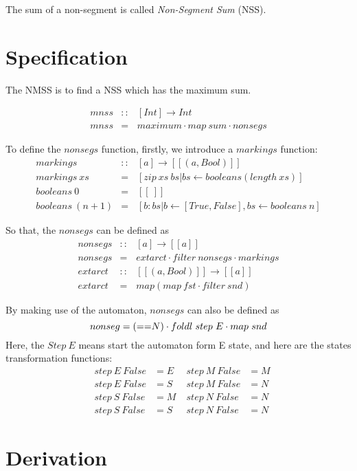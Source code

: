 \documentclass[10pt,a4paper]{article}
\begin{document}
The sum of a non-segment is called \textsl{Non-Segment Sum} (NSS).

\section{Specification}
The NMSS is to find a NSS which has the maximum sum.

\[
\begin{array}{lll}
mnss &::& [Int] \rightarrow Int \\
mnss &=& maximum \cdot map ~ sum \cdot nonsegs
\end{array}
\]

To define the \(nonsegs\) function, firstly, we introduce a $markings$ function:
\[
\begin{array}{lll}
markings  &::& [a] \rightarrow [[(a,Bool)]] \\
markings ~xs &=& [zip ~ xs ~ bs | bs \leftarrow booleans(length ~ xs)] \\
booleans ~ 0 &=& [[~]] \\
booleans ~ (n+1) &=&  [b:bs | b \leftarrow [True,False], bs \leftarrow booleans ~n]
\end{array}
\]

So that, the $nonsegs$ can be defined as 
\[
\begin{array}{lll}
nonsegs &::& [a] \rightarrow [[a]] \\
nonsegs &=& extarct \cdot filter ~ nonsegs \cdot markings \\
extarct &::& [[(a, Bool)]] \rightarrow [[a]] \\
extarct &=& map(map ~ fst \cdot filter ~ snd)
\end{array}
\] 

By making use of the automaton, $nonsegs$ can also be defined as
\[
nonseg  =  (\small{==} N) \cdot foldl~step~E \cdot map ~ snd
\]
Here, the \( Step ~ E\) means start the automaton form E state, and here are the states transformation functions:
\[
\begin{array}{lllll}
&step ~ E ~ False &= E \;  &step ~ M ~ False &= M  \\
&step ~ E ~ False &= S \;  &step ~ M ~ False &= N  \\
&step ~ S ~ False &= M \;  &step ~ N ~ False &= N  \\
&step ~ S ~ False &= S \;  &step ~ N ~ False &= N 
\end{array}
\]

\section{Derivation}
\end{document}

